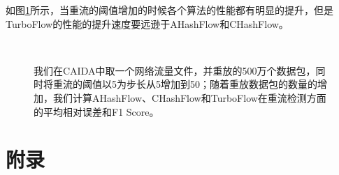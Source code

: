 \documentclass{article}
\begin{document}
如图\ref{fig:hh_dection_various_thresholds}所示，当重流的阈值增加的时候各个算法的性能都有明显的提升，但是TurboFlow的性能的提升速度要远逊于AHashFlow和CHashFlow。
\begin{figure}[ht!]
	\centering
	\mbox{
	}
	\caption{我们在CAIDA中取一个网络流量文件，并重放的500万个数据包，同时将重流的阈值以5为步长从5增加到50；随着重放数据包的数量的增加，我们计算AHashFlow、CHashFlow和TurboFlow在重流检测方面的平均相对误差和F1 Score。}
	\label{fig:hh_dection_various_thresholds}
\end{figure}


\appendix
\section*{附录}
\end{document}
